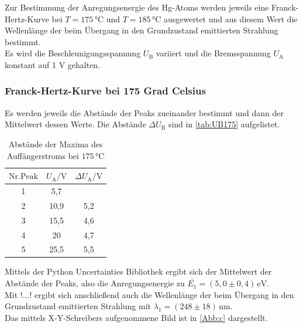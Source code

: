 Zur Bestimmung der Anregungsenergie des Hg-Atoms werden jeweils eine Franck-Hertz-Kurve
bei $T=175 \, \si{\celsius}$ und $T=185 \, \si{\celsius}$ ausgewertet und aus diesem Wert
die Wellenlänge der beim Übergang in den Grundzustand emittierten Strahlung bestimmt.\\
Es wird die Beschleunigungsspannung $U_{\mathrm{B}}$ variiert und die Bremsspannung $U_{\mathrm{A}}$ konstant auf
1 V gehalten.

\subsubsection{Franck-Hertz-Kurve bei 175 Grad Celsius}

Es werden jeweils die Abstände der Peaks zueinander bestimmt und dann der Mittelwert
dessen Werte. Die Abstände $\Delta U_{\mathrm{B}}$ sind in \autoref{tab:UB175} aufgelistet.

\begin{table}[!h]
  \begin{center}
    \begin{tabular}{|c|c|c|}
      \hline
      $\mathrm{Nr. Peak} $ & $U_{\mathrm{A}} / \si{\volt}$ & $\Delta U_{\mathrm{A}} / \si{\volt}$ \\
      \hline
      1 & 5,7 & \\
      2 & 10,9 & 5,2 \\
      3 & 15,5 & 4,6 \\
      4 & 20   & 4,7 \\
      5 & 25,5 & 5,5 \\
      \hline
    \end{tabular}
    \caption{Abstände der Maxima des Auffängerstroms bei $175 \, \si{\celsius}$}
    \label{tab:UB175}
  \end{center}
\end{table}

Mittels der Python Uncertainties Bibliothek \cite{python} ergibt sich der Mittelwert der Abstände der Peaks, also
die Anregungsenergie zu $\bar{E_1} = (5,0 \pm 0,4) \, \si{\electronvolt}$. \\
Mit !...! ergibt sich anschließend auch die Wellenlänge der beim Übergang in den
Grundzustand emittierten Strahlung mit $\lambda_1 = (248 \pm 18) \, \si{\nano\meter}$.\\
Das mittels X-Y-Schreibers aufgenommene Bild ist in \autoref{Abb:c} dargestellt.

